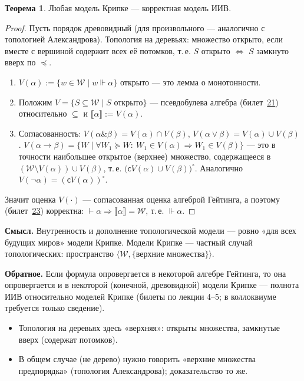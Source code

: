 \documentclass[11pt,a4paper]{article}
\newcommand{\amp}{\mathbin{\&}}
\newcommand{\vd}{\vdash}
\newcommand{\sem}[1]{\llbracket #1\rrbracket}
\newcommand{\cmpl}{\mathsf{c}}
\theoremstyle{definition}
\newtheorem*{thm}{Теорема}
\begin{document}
\begin{thm}
Любая модель Крипке --- корректная модель ИИВ.
\end{thm}
\begin{proof}
Пусть порядок древовидный (для произвольного --- аналогично с топологией Александрова). Топология на деревьях: множество открыто, если вместе с вершиной содержит всех её потомков, т.\,е. $S$ открыто $\iff$ $S$ замкнуто вверх по $\preceq$.
\begin{enumerate}
\item $V(\alpha):=\{w\in\mathcal{W}\mid w\Vdash\alpha\}$ открыто --- это лемма о монотонности.
\item Положим $V=\{S\subseteq\mathcal{W}\mid S\text{ открыто}\}$ --- псевдобулева алгебра (билет~\hyperref[T:21]{21}) относительно $\subseteq$ и $\sem{\alpha}:=V(\alpha)$.
\item Согласованность: $V(\alpha\amp\beta)=V(\alpha)\cap V(\beta)$, $V(\alpha\vee\beta)=V(\alpha)\cup V(\beta)$.
  $V(\alpha\to\beta)=\{W\mid\forall W_1\succeq W:\ W_1\in V(\alpha)\Rightarrow W_1\in V(\beta)\}$ --- это в точности наибольшее открытое (верхнее) множество, содержащееся в $(\mathcal{W}\setminus V(\alpha))\cup V(\beta)$, т.\,е. $\big(\cmpl V(\alpha)\cup V(\beta)\big)^\circ$. Аналогично $V(\neg\alpha)=(\cmpl V(\alpha))^\circ$.
\end{enumerate}
Значит оценка $V(\cdot)$ --- согласованная оценка алгеброй Гейтинга, а поэтому (билет~\hyperref[T:23]{23}) корректна: $\vd\alpha\Rightarrow\sem{\alpha}=\mathcal{W}$, т.\,е. $\Vdash\alpha$.
\end{proof}

\textbf{Смысл.} Внутренность и дополнение топологической модели --- ровно «для всех будущих миров» модели Крипке. Модели Крипке --- частный случай топологических: пространство $\langle\mathcal{W},\{\text{верхние множества}\}\rangle$.

\textbf{Обратное.} Если формула опровергается в некоторой алгебре Гейтинга, то она опровергается и в некоторой (конечной, древовидной) модели Крипке --- полнота ИИВ относительно моделей Крипке (билеты по лекции 4--5; в коллоквиуме требуется только сведение).

\begin{warn}
\begin{itemize}
\item Топология на деревьях здесь «верхняя»: открыты множества, замкнутые вверх (содержат потомков).
\item В общем случае (не дерево) нужно говорить «верхние множества предпорядка» (топология Александрова); доказательство то же.
\end{itemize}
\end{warn}
\end{document}
